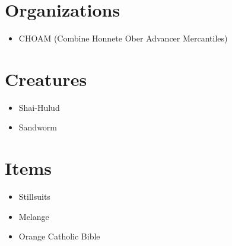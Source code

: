 \documentclass{article}
\begin{document}
\section{Organizations}
\begin{itemize}
\item CHOAM (Combine Honnete Ober Advancer Mercantiles)
\end{itemize}

\section{Creatures}
\begin{itemize}
\item Shai-Hulud
\item Sandworm 
\end{itemize}

\section{Items}
\begin{itemize}
\item Stillsuits
\item Melange
\item Orange Catholic Bible
\end{itemize}
\end{document}
